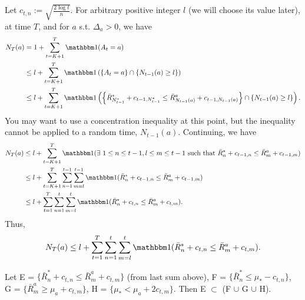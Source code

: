 \documentclass[11pt]{article}
\begin{document}
Let $c_{t,n} := \sqrt{\frac{2\log t}{n}}$.  For arbitrary positive integer $l$ (we will choose its value later), at time $T$, and for $a$ s.t. $\Delta_a > 0$, we have
\begin{align*}
N_T(a) &= 1 + \sum\limits^T_{t = K + 1} \ind (A_t = a)\\
&\leq l + \sum\limits^T_{t = K + 1} \ind \left(\left\{A_t = a\right\} \cap \left\{N_{t-1}(a) \geq l\right\}\right)\\
&\leq l + \sum\limits^T_{t = K + 1} \ind\left(\left\{\bar
  R^*_{N_{t-1}^*} + c_{t-1,N_{t-1}^*} \leq \bar R^a_{N_{t-1}(a)} +
  c_{t-1,N_{t-1}(a)} \right\} \cap \left\{N_{t-1}(a) \geq l\right\}\right).
\end{align*}
You may want to use a concentration inequality at this point, but the
inequality cannot be applied to a random time,
$N_{t-1}(a)$. Continuing, we have 
\begin{align*}
N_T(a) &\leq l +  \sum\limits^T_{t = K + 1} \ind( \exists \  1 \leq n \leq t-1, l \leq m \leq t-1 \text{ such that } \bar R^*_{n} + c_{t-1,n} \leq \bar R^a_{m} + c_{t-1,m}   )\\
  &\leq l +  \sum\limits^T_{t = K + 1}  \sum\limits^{t-1}_{n = 1}  \sum\limits^{t-1}_{m = l} \ind (\bar R^*_{n} + c_{t-1,n} \leq \bar R^a_{m} + c_{t-1,m}  )\\
  &\leq l +  \sum\limits^T_{t = 1}  \sum\limits^{t}_{n = 1}  \sum\limits^{t}_{m = l} \ind (\bar R^*_{n} + c_{t,n} \leq \bar R^a_{m} + c_{t,m}  ).
\end{align*}
Thus,
\begin{align}
  \label{eq:1}
  N_T(a)  \leq l +  \sum\limits^T_{t = 1}  \sum\limits^{t}_{n = 1}  \sum\limits^{t}_{m = l} \ind (\bar R^*_{n} + c_{t,n} \leq \bar R^a_{m} + c_{t,m} ).
\end{align}

\begin{lemma}\label{lem}
Let E = $\{ \bar R^*_{n} + c_{t,n} \leq \bar R^a_{m} + c_{t,m} \}$ (from last sum above), F = $\{ \bar R^*_{n} \leq \mu_* - c_{t,n} \}$,\\ G = $\{ \bar R^a_{m} \geq \mu_a + c_{t,m} \}$, H = $\{ \mu_* < \mu_a + 2c_{t,m} \}$.  Then E $\subset $ (F $\cup$ G $\cup$ H).
\end{lemma}
\end{document}
